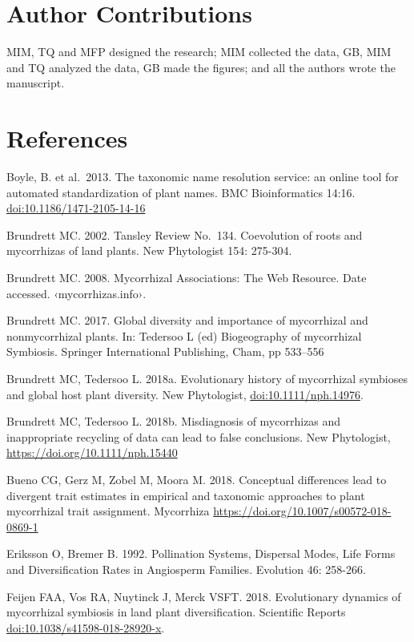 \documentclass[12pt,]{article}
\begin{document}
\hypertarget{author-contributions}{%
\section{Author Contributions}\label{author-contributions}}

MIM, TQ and MFP designed the research; MIM collected the data, GB, MIM
and TQ analyzed the data, GB made the figures; and all the authors wrote
the manuscript.

\hypertarget{references}{%
\section{References}\label{references}}

Boyle, B. et al.~2013. The taxonomic name resolution service: an online
tool for automated standardization of plant names. BMC Bioinformatics
14:16. \url{doi:10.1186/1471-2105-14-16}

Brundrett MC. 2002. Tansley Review No.~134. Coevolution of roots and
mycorrhizas of land plants. New Phytologist 154: 275-304.

Brundrett MC. 2008. Mycorrhizal Associations: The Web Resource. Date
accessed. ‹mycorrhizas.info›.

Brundrett MC. 2017. Global diversity and importance of mycorrhizal and
nonmycorrhizal plants. In: Tedersoo L (ed) Biogeography of mycorrhizal
Symbiosis. Springer International Publishing, Cham, pp 533--556

Brundrett MC, Tedersoo L. 2018a. Evolutionary history of mycorrhizal
symbioses and global host plant diversity. New Phytologist,
\url{doi:10.1111/nph.14976}.

Brundrett MC, Tedersoo L. 2018b. Misdiagnosis of mycorrhizas and
inappropriate recycling of data can lead to false conclusions. New
Phytologist, \url{https://doi.org/10.1111/nph.15440}

Bueno CG, Gerz M, Zobel M, Moora M. 2018. Conceptual differences lead to
divergent trait estimates in empirical and taxonomic approaches to plant
mycorrhizal trait assignment. Mycorrhiza
\url{https://doi.org/10.1007/s00572-018-0869-1}

Eriksson O, Bremer B. 1992. Pollination Systems, Dispersal Modes, Life
Forms and Diversification Rates in Angiosperm Families. Evolution 46:
258-266.

Feijen FAA, Vos RA, Nuytinck J, Merck VSFT. 2018. Evolutionary dynamics
of mycorrhizal symbiosis in land plant diversification. Scientific
Reports \url{doi:10.1038/s41598-018-28920-x}.
\end{document}
